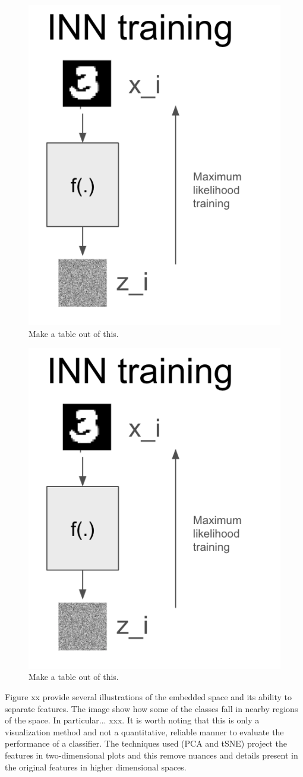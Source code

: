 \begin{figure}
    \vskip -0.2in 
    \centering
    \includegraphics[width=0.30\columnwidth]{fig_datasynth/inn_train.png}    
    \vspace{-2pt}
    \caption{\label{fig:exp_vrae_1} Make a table out of this.}
    \vskip -0.0in 
\end{figure}
        
\begin{figure}
    \vskip -0.2in 
    \centering
    \includegraphics[width=0.30\columnwidth]{fig_datasynth/inn_train.png}      
    \vspace{-2pt}
    \caption{\label{fig:exp_vrae_2} Make a table out of this.}
    \vskip -0.0in 
\end{figure}

        
Figure xx provide several illustrations of the embedded space and its ability to separate features. The image show how some of the classes fall in nearby regions of the space. In particular... xxx. It is worth noting that this is only a visualization method and not a quantitative, reliable manner to evaluate the performance of a classifier. The techniques used (PCA and tSNE) project the features in two-dimensional plots and this remove nuances and details present in the original features in higher dimensional spaces.



